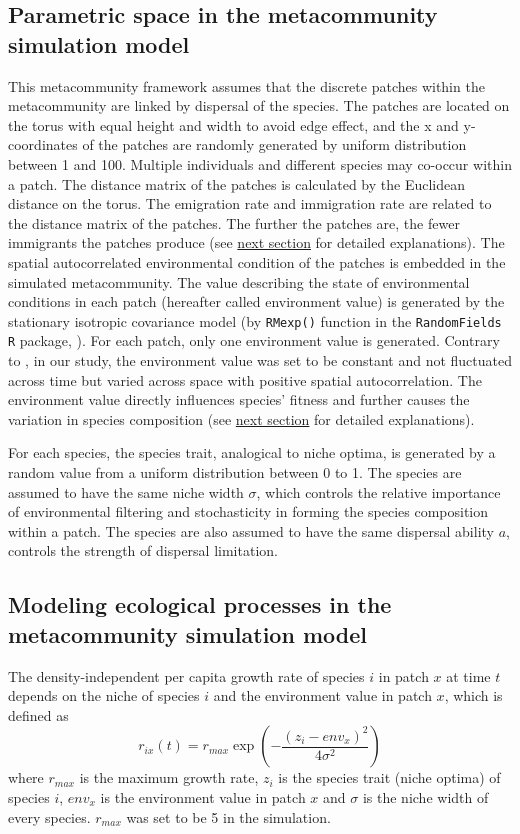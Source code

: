 	
	
	\subsection{Parametric space in the metacommunity simulation model}
	\noindent
	This metacommunity framework assumes that the discrete patches within the metacommunity are linked by dispersal of the species. The patches are located on the torus with equal height and width to avoid edge effect, and the x and y-coordinates of the patches are randomly generated by uniform distribution between 1 and 100. Multiple individuals and different species may co-occur within a patch. The distance matrix of the patches is calculated by the Euclidean distance on the torus. The emigration rate and immigration rate are related to the distance matrix of the patches. The further the patches are, the fewer immigrants the patches produce (see \hyperref[Modelc]{next section} for detailed explanations). The spatial autocorrelated environmental condition of the patches is embedded in the simulated metacommunity. The value describing the state of environmental conditions in each patch (hereafter called environment value) is generated by the stationary isotropic covariance model (by \texttt{RMexp()} function in the \texttt{RandomFields} \texttt{R} package, \citealp{schlather2015analysis}). For each patch, only one environment value is generated. Contrary to \citet{thompson2020process}, in our study, the environment value was set to be constant and not fluctuated across time but varied across space with positive spatial autocorrelation. The environment value directly influences species' fitness and further causes the variation in species composition  (see \hyperref[Modelc]{next section} for detailed explanations).
	
	For each species, the species trait, analogical to niche optima, is generated by a random value from a uniform distribution between 0 to 1. The species are assumed to have the same niche width $\sigma$, which controls the relative importance of environmental filtering and stochasticity in forming the species composition within a patch. The species are also assumed to have the same dispersal ability $a$, controls the strength of dispersal limitation.
	
	\subsection{Modeling ecological processes in the metacommunity simulation model}
	\noindent
	\label{Modelc}
	The density-independent per capita growth rate of species $i$ in patch $x$ at time $t$ depends on the niche of species $i$ and the environment value in patch $x$, which is defined as 
	\[
	r_{ix}(t) = r_{max}\exp(-\frac{(z_i-env_x)^2}{4\sigma^2})
	\] 
	where $r_{max}$ is the maximum growth rate, $z_i$ is the species trait (niche optima) of species $i$, $env_x$ is the environment value in patch $x$ and $\sigma$ is the niche width of every species. $r_{max}$ was set to be 5 in the simulation.
	
